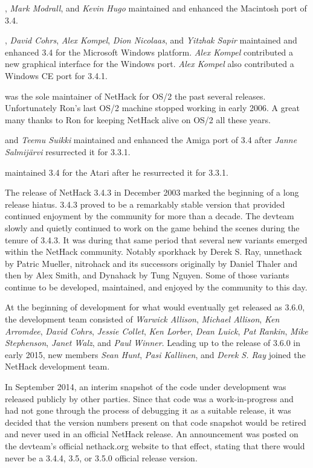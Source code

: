 \medskip
{}, {\it Mark Modrall}, and {\it Kevin Hugo} maintained and
enhanced the Macintosh port of 3.4.

\medskip
{}, {\it David Cohrs}, {\it Alex Kompel}, {\it Dion Nicolaas}, and 
{\it Yitzhak Sapir} maintained and enhanced 3.4 for the Microsoft Windows platform.
{\it Alex Kompel} contributed a new graphical interface for the Windows port. 
{\it Alex Kompel} also contributed a Windows CE port for 3.4.1.

\medskip
{} was the sole maintainer of NetHack for OS/2 the past
several releases. Unfortunately Ron's last OS/2 machine stopped working in
early 2006. A great many thanks to Ron for keeping NetHack alive on OS/2 
all these years.

\medskip
{} and {\it Teemu Suikki} maintained
and enhanced the Amiga port of 3.4 after {\it Janne Salmij\"{a}rvi} resurrected
it for 3.3.1.

\medskip
{} maintained 3.4 for the Atari after he
resurrected it for 3.3.1.

\medskip
The release of NetHack 3.4.3 in December 2003 marked the beginning of a 
long release hiatus. 3.4.3 proved to be a remarkably stable version that
provided continued enjoyment by the community for more than a decade. The 
devteam slowly and quietly continued to work on the game behind the scenes 
during the tenure of 3.4.3. It was during that same period that several new 
variants emerged within the NetHack community. Notably sporkhack by 
Derek S. Ray, unnethack by Patric Mueller, nitrohack and its successors 
originally by Daniel Thaler and then by Alex Smith, and 
Dynahack by Tung Nguyen. Some of those variants continue to be developed, 
maintained, and enjoyed by the community to this day.

\medskip
At the beginning of development for what would eventually get released
as 3.6.0, the development team consisted of {\it Warwick Allison}, 
{\it Michael Allison}, {\it Ken Arromdee},
{\it David Cohrs}, {\it Jessie Collet}, 
{\it Ken Lorber}, {\it Dean Luick}, {\it Pat Rankin}, 
{\it Mike Stephenson}, {\it Janet Walz}, and {\it Paul Winner}.
Leading up to the release of 3.6.0 in early 2015, new members
{\it Sean Hunt}, {\it Pasi Kallinen}, and {\it Derek S. Ray}
joined the NetHack development team.

\medskip
In September 2014, an interim snapshot of the code under development was 
released publicly by other parties. Since that code was a work-in-progress 
and had not gone through the process of debugging it as a suitable release,
it was decided that the version numbers present on that code snapshot would 
be retired and never used in an official NetHack release. An announcement 
was posted on the devteam's official nethack.org website to that effect, 
stating that there would never be a 3.4.4, 3.5, or 3.5.0 official release 
version.

